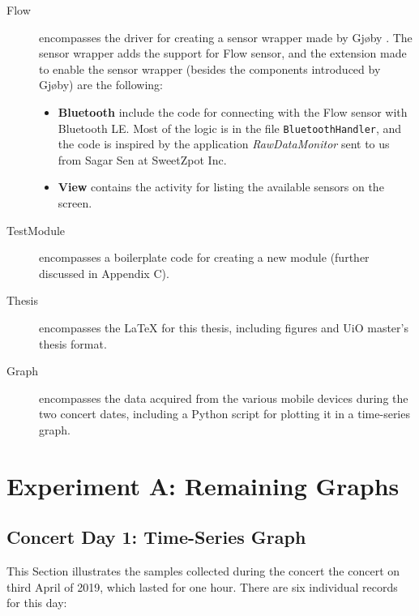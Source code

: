 \begin{description}
    \item[Flow] encompasses the driver for creating a sensor wrapper made by Gjøby \cite{gjoby}. The sensor wrapper adds the support for Flow sensor, and the extension made to enable the sensor wrapper (besides the components introduced by Gjøby) are the following:
    \begin{itemize}
        \item \textbf{Bluetooth} include the code for connecting with the Flow sensor with Bluetooth LE. Most of the logic is in the file \verb|BluetoothHandler|, and the code is inspired by the application \textit{RawDataMonitor} sent to us from Sagar Sen at SweetZpot Inc. 
        \item \textbf{View} contains the activity for listing the available sensors on the screen. 
    \end{itemize}

    \item[TestModule] encompasses a boilerplate code for creating a new module (further discussed in Appendix C).
    \item[Thesis] encompasses the LaTeX for this thesis, including figures and UiO master's thesis format.
    \item[Graph] encompasses the data acquired from the various mobile devices during the two concert dates, including a Python script for plotting it in a time-series graph.

\end{description}

\chapter{Experiment A: Remaining Graphs}

\section{Concert Day 1: Time-Series Graph}
This Section illustrates the samples collected during the concert the concert on third April of 2019, which lasted 
for one hour. There are six individual records for this day: 

